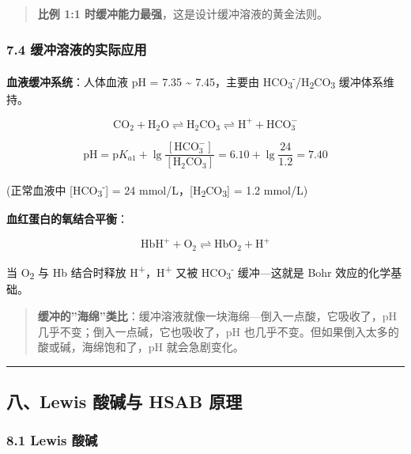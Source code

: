 \documentclass[a4paper,11pt]{ctexart}
\newcommand{\箭}{\ensuremath{\rightarrow}}
\newcommand{\左箭}{\ensuremath{\leftarrow}}
\newcommand{\上箭}{\ensuremath{\uparrow}}
\newcommand{\下箭}{\ensuremath{\downarrow}}
\newcommand{\衡}{\ensuremath{\rightleftharpoons}}
\newcommand{\双箭}{\ensuremath{\leftrightarrow}}
\newcommand{\约等于}{\ensuremath{\approx}}
\newcommand{\小于等于}{\ensuremath{\leq}}
\newcommand{\大于等于}{\ensuremath{\geq}}
\newcommand{\不等于}{\ensuremath{\neq}}
\newcommand{\西格马}{\ensuremath{\sigma}}
\newcommand{\派}{\ensuremath{\pi}}
\begin{document}
\begin{quote}
\textbf{比例 1:1 时缓冲能力最强}，这是设计缓冲溶液的黄金法则。
\end{quote}

\subsubsection{7.4 缓冲溶液的实际应用}\label{ux7f13ux51b2ux6eb6ux6db2ux7684ux5b9eux9645ux5e94ux7528}

\textbf{血液缓冲系统}：人体血液 pH = 7.35 \textasciitilde{} 7.45，主要由 HCO\textsubscript{3}\textsuperscript{-}/H\textsubscript{2}CO\textsubscript{3} 缓冲体系维持。

\[
\mathrm{CO_2 + H_2O \rightleftharpoons H_2CO_3 \rightleftharpoons H^+ + HCO_3^-}
\]

\[
\mathrm{pH} = \mathrm{p}K_{a1} + \lg\frac{[\mathrm{HCO_3^-}]}{[\mathrm{H_2CO_3}]} = 6.10 + \lg\frac{24}{1.2} = 7.40
\]

(正常血液中 {[}HCO\textsubscript{3}\textsuperscript{-}{]} = 24 mmol/L，{[}H\textsubscript{2}CO\textsubscript{3}{]} = 1.2 mmol/L)

\textbf{血红蛋白的氧结合平衡}：

\[
\mathrm{HbH^+ + O_2 \rightleftharpoons HbO_2 + H^+}
\]

当 O\textsubscript{2} 与 Hb 结合时释放 H\textsuperscript{+}，H\textsuperscript{+} 又被 HCO\textsubscript{3}\textsuperscript{-} 缓冲---这就是 Bohr 效应的化学基础。

\begin{quote}
\textbf{缓冲的''海绵''类比}：缓冲溶液就像一块海绵---倒入一点酸，它吸收了，pH 几乎不变；倒入一点碱，它也吸收了，pH 也几乎不变。但如果倒入太多的酸或碱，海绵饱和了，pH 就会急剧变化。
\end{quote}

\begin{center}\rule{0.5\linewidth}{0.5pt}\end{center}

\subsection{八、Lewis 酸碱与 HSAB 原理}\label{ux516blewis-ux9178ux78b1ux4e0e-hsab-ux539fux7406}

\subsubsection{8.1 Lewis 酸碱}\label{lewis-ux9178ux78b1}
\end{document}
